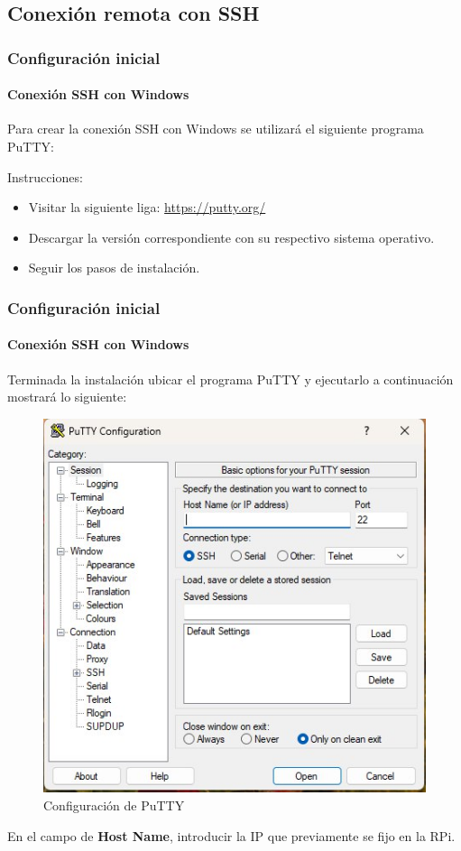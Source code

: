 \documentclass{beamer}
\begin{document}
	\subsection{Conexión remota con SSH}
	\begin{frame}
		\frametitle{Configuración inicial}
		\framesubtitle{Conexión SSH con Windows}
		Para crear la conexión SSH con Windows se utilizará el siguiente programa PuTTY:
		\begin{mybox}{Instrucciones:}
			\begin{itemize}
				\item Visitar la siguiente liga: \url{https://putty.org/}
				\item Descargar la versión correspondiente con su respectivo sistema operativo.
				\item Seguir los pasos de instalación.
			\end{itemize}
		\end{mybox}
	\end{frame}
	\begin{frame}
		\frametitle{Configuración inicial}
		\framesubtitle{Conexión SSH con Windows}
		Terminada la instalación ubicar el programa PuTTY y ejecutarlo a continuación mostrará lo siguiente:
		\begin{figure}
			\includegraphics[scale=0.4]{putty.jpeg}
			\caption{Configuración de PuTTY}
		\end{figure}
		En el campo de \textbf{Host Name}, introducir la IP que previamente se fijo en la RPi.
	\end{frame}
	
\end{document}
